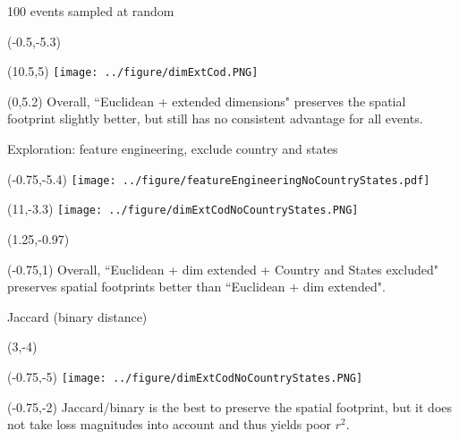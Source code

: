 \documentclass[aspectratio=169]{beamer}
\begin{document}
\begin{frame}{100 events sampled at random}
\begin{textblock}{1}(-0.5,-5.3)
\end{textblock}

\begin{textblock}{1}(10.5,5)
\texttt{[image: ../figure/dimExtCod.PNG]}
\end{textblock}


\begin{textblock}{10}(0,5.2)
Overall, ``Euclidean + extended dimensions" preserves the spatial footprint slightly better, but still has no consistent advantage for all events.
\end{textblock}
\end{frame}


\begin{frame}{Exploration: feature engineering, exclude country and states}
\begin{textblock}{1}(-0.75,-5.4)
\texttt{[image: ../figure/featureEngineeringNoCountryStates.pdf]}
\end{textblock}

\begin{textblock}{1}(11,-3.3)
\texttt{[image: ../figure/dimExtCodNoCountryStates.PNG]}
\end{textblock}

\begin{textblock}{1}(1.25,-0.97)
\end{textblock}

\begin{textblock}{1.5}(-0.75,1)
\tiny Overall, ``Euclidean + dim extended + Country and States excluded" preserves spatial footprints better than ``Euclidean + dim extended".
\end{textblock}

\end{frame}



\begin{frame}{Jaccard (binary distance) }

\begin{textblock}{1}(3,-4)
\end{textblock}


\begin{textblock}{1}(-0.75,-5)
\texttt{[image: ../figure/dimExtCodNoCountryStates.PNG]}
\end{textblock}


\begin{textblock}{3}(-0.75,-2)
Jaccard/binary is the best to preserve the spatial footprint, but it does not take loss magnitudes into account and thus yields poor $r^2$.
\end{textblock}
\end{frame}
\end{document}
